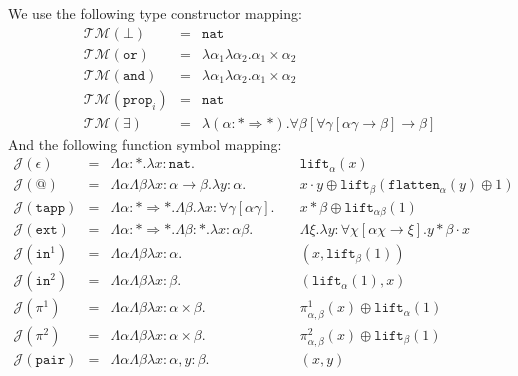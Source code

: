 \documentclass[runningheads,a4paper]{llncs}
\newcommand{\Typemap}{\mathcal{T\!M}}
\newcommand{\Termmap}{\mathcal{J}}
\newcommand{\quant}[2]{\forall #1[#2]}
\newcommand{\arrtype}{\rightarrow}
\newcommand{\arrkind}{\Rightarrow}
\newcommand{\abs}[2]{\lambda #1.#2}
\newcommand{\tabs}[2]{\Lambda #1.#2}
\newcommand{\nat}{\mathtt{nat}}
\newcommand{\flatten}{\mathtt{flatten}}
\newcommand{\lift}{\mathtt{lift}}
\begin{document}
We use the following type constructor mapping:
\[
\begin{array}{rcl}
\Typemap(\bot) & = & \nat \\
\Typemap(\mathtt{or}) & = & \lambda\alpha_1\lambda\alpha_2 . \alpha_1 \times \alpha_2 \\
\Typemap(\mathtt{and}) & = & \lambda\alpha_1\lambda\alpha_2 . \alpha_1 \times \alpha_2 \\
\Typemap(\mathtt{prop}_i) & = & \nat \\
\Typemap(\exists) & = & \lambda(\alpha : * \arrkind *) . \quant{\beta}{\quant{\gamma}{\alpha\gamma \arrtype \beta} \arrtype \beta}
\end{array}
\]
And the following function symbol mapping:
\[
\begin{array}{rcll}
\Termmap(\epsilon) & = & \Lambda \alpha:* . \lambda x:\nat. &
  \mathtt{lift}_\alpha(x) \\
\Termmap(@) & = & \Lambda\alpha\Lambda\beta\lambda x: \alpha \arrtype \beta . \lambda y :
  \alpha . \quad & x \cdot y \oplus \lift_\beta(\flatten_\alpha(
  y) \oplus 1) \\
\Termmap(\mathtt{tapp}) & = & \Lambda \alpha : * \arrkind * . \Lambda \beta . \lambda x : \quant{\gamma}{\alpha\gamma} . \quad & x * \beta \oplus \lift_{\alpha\beta}(1) \\
\Termmap(\mathtt{ext}) & = & \Lambda \alpha : * \arrkind * . \Lambda \beta : * . \lambda x:\alpha\beta . &
  \tabs{\xi}{\abs{y:\quant{\chi}{\alpha\chi
  \arrtype \xi}}{y * \beta \cdot x}} \\
\Termmap(\mathtt{in}^1) & = & \Lambda \alpha \Lambda \beta \lambda x : \alpha.\quad &
  (x, \mathtt{lift}_\beta(1)) \\
\Termmap(\mathtt{in}^2) & = & \Lambda \alpha \Lambda \beta \lambda x : \beta.\quad &
  (\mathtt{lift}_\alpha(1), x) \\
\Termmap(\pi^1) & = & \Lambda \alpha \Lambda \beta \lambda x : \alpha \times \beta.
  \quad & \pi^1_{\alpha,\beta}(x) \oplus \lift_{\alpha}(1) \\
\Termmap(\pi^2) & = & \Lambda \alpha \Lambda \beta \lambda x : \alpha \times \beta.
  \quad & \pi^2_{\alpha,\beta}(x) \oplus \lift_{\beta}(1) \\
\Termmap(\mathtt{pair}) & = & \Lambda \alpha \Lambda \beta \lambda x : \alpha, y :
  \beta.\quad & (x, y) \\
\end{array}
\]
\end{document}
